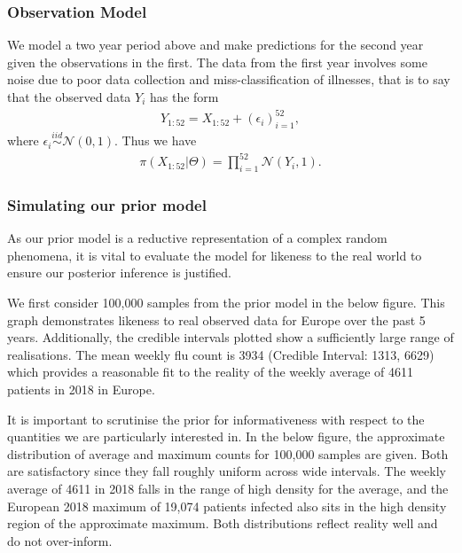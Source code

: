 \documentclass[letterpaper,10pt,english]{sphinxmanual}
\begin{document}
\subsubsection{Observation Model}
\label{\detokenize{models/how_big:observation-model}}
We model a two year period above and make predictions for the
second year given the observations in the first. The data from the first year involves some noise due to poor data collection and miss-classification of illnesses, that is to say that the observed data \(Y_i\) has the form
\begin{equation*}
\begin{split}Y_{1:52} = X_{1:52} + (\epsilon_i)_{i=1}^{52},\end{split}
\end{equation*}
where \(\epsilon_{i} \stackrel{iid}{\sim} \mathcal{N}(0,1)\). Thus
we have
\begin{equation*}
\begin{split}\pi(X_{1:52}|\Theta) = \prod_{i=1}^{52}\mathcal{N}(Y_{i},1).\end{split}
\end{equation*}

\subsubsection{Simulating our prior model}
\label{\detokenize{models/how_big:simulating-our-prior-model}}
As our prior model is a reductive representation of a complex random
phenomena, it is vital to evaluate the model for likeness to the
real world to ensure our posterior inference is justified.

We first consider 100,000 samples from the prior model in the below figure.
This graph demonstrates likeness to real observed data for Europe over
the past 5 years. Additionally, the credible
intervals plotted show a sufficiently large range of realisations. The
mean weekly flu count is 3934 (Credible Interval: 1313, 6629) which provides
a reasonable fit to the reality of the weekly average of 4611 patients in 2018 in Europe.

\noindent{}

It is important to scrutinise the prior for informativeness with respect
to the quantities we are particularly interested in. In the below figure, the
approximate distribution of average and maximum counts for 100,000
samples are given. Both are satisfactory since they fall roughly
uniform across wide intervals. The weekly average of 4611 in 2018 falls
in the range of high density for the average, and the European 2018
maximum of 19,074 patients infected also sits in the high density region
of the approximate maximum. Both distributions reflect reality well and
do not over-inform.
\end{document}
